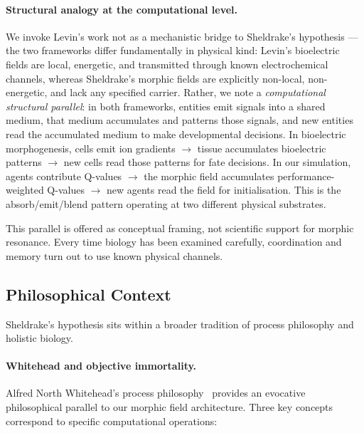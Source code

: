 \documentclass[twoside,11pt]{article}
\begin{document}
\paragraph{Structural analogy at the computational level.}
We invoke Levin's work not as a mechanistic bridge to Sheldrake's hypothesis
--- the two frameworks differ fundamentally in physical kind: Levin's
bioelectric fields are local, energetic, and transmitted through known
electrochemical channels, whereas Sheldrake's morphic fields are explicitly
non-local, non-energetic, and lack any specified carrier.  Rather, we note
a \emph{computational structural parallel}: in both frameworks, entities
emit signals into a shared medium, that medium accumulates and patterns those
signals, and new entities read the accumulated medium to make developmental
decisions.  In bioelectric morphogenesis, cells emit ion gradients $\rightarrow$
tissue accumulates bioelectric patterns $\rightarrow$ new cells read those
patterns for fate decisions.  In our simulation, agents contribute Q-values
$\rightarrow$ the morphic field accumulates performance-weighted Q-values
$\rightarrow$ new agents read the field for initialisation.  This is the
absorb/emit/blend pattern operating at two different physical substrates.

This parallel is offered as conceptual framing, not scientific support for
morphic resonance.  Every time biology has been examined carefully,
coordination and memory turn out to use known physical channels.

\subsection{Philosophical Context}
\label{sec:background:philosophy}

Sheldrake's hypothesis sits within a broader tradition of process philosophy
and holistic biology.

\paragraph{Whitehead and objective immortality.}
Alfred North Whitehead's process philosophy~\citep{whitehead1929} provides
an evocative philosophical parallel to our morphic field architecture.
Three key concepts correspond to specific computational operations:
\end{document}
